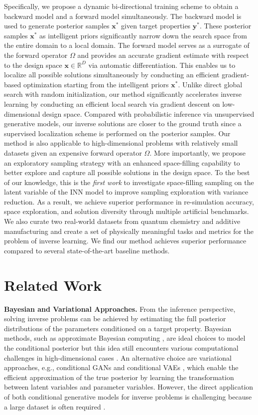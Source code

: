 \documentclass[letterpaper]{article} %
\begin{document}
Specifically, we propose a dynamic bi-directional training scheme to obtain a backward model and a forward model simultaneously. The backward model is used to generate posterior samples $\mathbf{x}^*$ given target properties $\mathbf{y}^*$. These posterior samples $\mathbf{x}^*$ as intelligent priors significantly narrow down the search space from the entire domain to a local domain. The forward model serves as a surrogate of the forward operator $\Omega$ and provides an accurate gradient estimate with respect to the design space $\mathbf{x} \in \mathbb{R}^D$ via automatic differentiation. This enables us to localize all possible solutions simultaneously by conducting an efficient gradient-based optimization starting from the intelligent priors $\mathbf{x}^*$. Unlike direct global search with random initialization, our method significantly accelerates inverse learning by conducting an efficient local search via gradient descent on low-dimensional design space. Compared with probabilistic inference via unsupervised generative models, our inverse solutions are closer to the ground truth since a supervised localization scheme is performed on the posterior samples. Our method is also applicable to high-dimensional problems with relatively small datasets given an expensive forward operator $\Omega$. More importantly, we propose an exploratory sampling strategy with an enhanced space-filling capability to better explore and capture all possible solutions in the design space. To the best of our knowledge, this is the \emph{first work} to investigate space-filling sampling on the latent variable of the INN model to improve sampling exploration with variance reduction. As a result, we achieve superior performance in re-simulation accuracy, space exploration, and solution diversity through multiple artificial benchmarks. We also curate two real-world datasets from quantum chemistry and additive manufacturing and create a set of physically meaningful tasks and metrics for the problem of inverse learning. We find our method achieves superior performance compared to several state-of-the-art baseline methods.

\section{Related Work}
{\bf Bayesian and Variational Approaches.}
From the inference perspective, solving inverse problems can be achieved by estimating the full posterior distributions of the parameters conditioned on a target property. Bayesian methods, such as approximate Bayesian computing \citep{yang2018predictive}, are ideal choices to model the conditional posterior but this idea still encounters various computational challenges in high-dimensional cases \cite{zhang2018effect,zhang2018quantification}. An alternative choice are variational approaches, e.g., conditional GANs \citep{wang2018high} and conditional VAEs \citep{sohn2015learning}, which enable the efficient approximation of the true posterior by learning the transformation between latent variables and parameter variables. However, the direct application of both conditional generative models for inverse problems is challenging because a large dataset is often required \citep{tonolini2020variational}.
\end{document}
